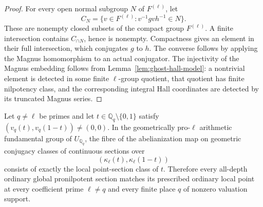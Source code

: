 \begin{proof}
For every open normal subgroup \(N\) of
\(F^{(\ell)}\), let
\[
 C_N=\{v\in F^{(\ell)}:v^{-1}gvh^{-1}\in N\}.
\]
These are nonempty closed subsets of the compact
group \(F^{(\ell)}\). A finite intersection contains
\(C_{\cap N}\), hence is nonempty. Compactness gives
an element in their full intersection, which conjugates
\(g\) to \(h\). The converse follows by applying the
Magnus homomorphism to an actual conjugator. The
injectivity of the Magnus embedding follows from
Lemma~\ref{lem:ghost-hall-model}: a nontrivial element
is detected in some finite \(\ell\)-group quotient,
that quotient has finite nilpotency class, and the
corresponding integral Hall coordinates are detected
by its truncated Magnus series.
\end{proof}

\begin{proposition}
\label{prop:ghost-local-boundary}
Let \(q\ne\ell\) be primes and let
\(t\in\mathbb Q_q\setminus\{0,1\}\) satisfy
\((v_q(t),v_q(1-t))\ne(0,0)\). In the geometrically
pro-\(\ell\) arithmetic fundamental group of
\(U_{\mathbb Q_q}\), the fibre of the abelianization
map on geometric conjugacy classes of continuous
sections over
\[
             (\kappa_\ell(t),\kappa_\ell(1-t))
\]
consists of exactly the local point-section class of
\(t\). Therefore every all-depth ordinary global
pronilpotent section matches its prescribed ordinary
local point at every coefficient prime \(\ell\ne q\)
and every finite place \(q\) of nonzero valuation
support.
\end{proposition}
